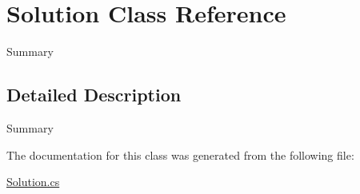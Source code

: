 \hypertarget{class_solution}{}\section{Solution Class Reference}
\label{class_solution}


Summary  




\subsection{Detailed Description}
Summary 



The documentation for this class was generated from the following file\+:\begin{DoxyCompactItemize}
\item 
\mbox{\hyperlink{_solution_8cs}{Solution.\+cs}}\end{DoxyCompactItemize}
